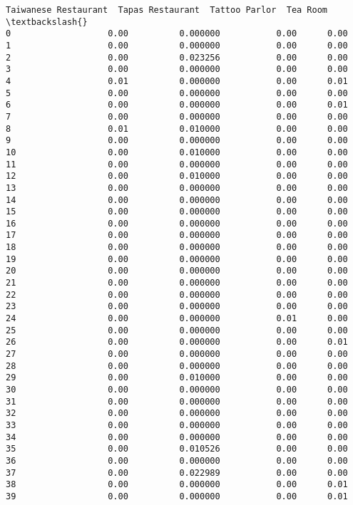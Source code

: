 \documentclass[11pt]{article}
\begin{document}
\begin{tcolorbox}[breakable, size=fbox, boxrule=.5pt, pad at break*=1mm, opacityfill=0]
\begin{Verbatim}[commandchars=\\\{\}]
    Taiwanese Restaurant  Tapas Restaurant  Tattoo Parlor  Tea Room  \textbackslash{}
0                   0.00          0.000000           0.00      0.00
1                   0.00          0.000000           0.00      0.00
2                   0.00          0.023256           0.00      0.00
3                   0.00          0.000000           0.00      0.00
4                   0.01          0.000000           0.00      0.01
5                   0.00          0.000000           0.00      0.00
6                   0.00          0.000000           0.00      0.01
7                   0.00          0.000000           0.00      0.00
8                   0.01          0.010000           0.00      0.00
9                   0.00          0.000000           0.00      0.00
10                  0.00          0.010000           0.00      0.00
11                  0.00          0.000000           0.00      0.00
12                  0.00          0.010000           0.00      0.00
13                  0.00          0.000000           0.00      0.00
14                  0.00          0.000000           0.00      0.00
15                  0.00          0.000000           0.00      0.00
16                  0.00          0.000000           0.00      0.00
17                  0.00          0.000000           0.00      0.00
18                  0.00          0.000000           0.00      0.00
19                  0.00          0.000000           0.00      0.00
20                  0.00          0.000000           0.00      0.00
21                  0.00          0.000000           0.00      0.00
22                  0.00          0.000000           0.00      0.00
23                  0.00          0.000000           0.00      0.00
24                  0.00          0.000000           0.01      0.00
25                  0.00          0.000000           0.00      0.00
26                  0.00          0.000000           0.00      0.01
27                  0.00          0.000000           0.00      0.00
28                  0.00          0.000000           0.00      0.00
29                  0.00          0.010000           0.00      0.00
30                  0.00          0.000000           0.00      0.00
31                  0.00          0.000000           0.00      0.00
32                  0.00          0.000000           0.00      0.00
33                  0.00          0.000000           0.00      0.00
34                  0.00          0.000000           0.00      0.00
35                  0.00          0.010526           0.00      0.00
36                  0.00          0.000000           0.00      0.00
37                  0.00          0.022989           0.00      0.00
38                  0.00          0.000000           0.00      0.01
39                  0.00          0.000000           0.00      0.01


\end{Verbatim}
\end{tcolorbox}
\end{document}

